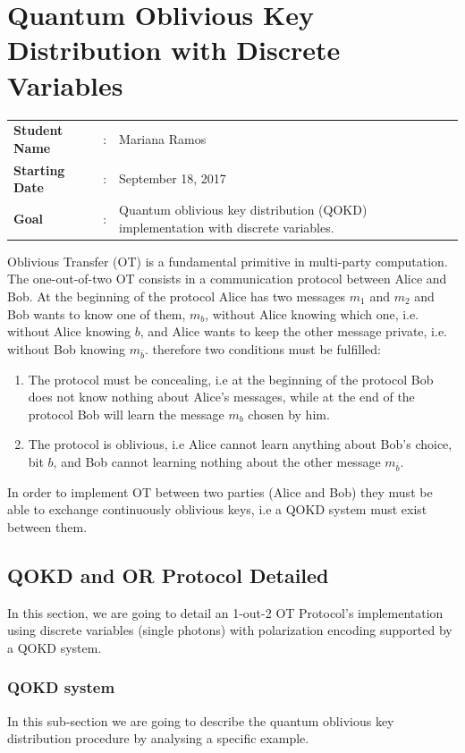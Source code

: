 \clearpage
\section{Quantum Oblivious Key Distribution with Discrete Variables}

\begin{tcolorbox}	
\begin{tabular}{p{2.75cm} p{0.2cm} p{10.5cm}} 	
\textbf{Student Name}  &:& Mariana Ramos\\
\textbf{Starting Date} &:& September 18, 2017\\
\textbf{Goal}          &:& Quantum oblivious key distribution (QOKD) implementation with discrete variables.
\end{tabular}
\end{tcolorbox}

Oblivious Transfer (OT) is a fundamental primitive in multi-party computation. The one-out-of-two OT consists in a communication protocol between Alice and Bob. At the beginning of the protocol Alice has two messages $m_1$ and $m_2$ and Bob wants to know one of them, $m_b$, without Alice knowing which one, i.e. without Alice knowing $b$, and Alice wants to keep the other message private, i.e. without Bob knowing $m_{\bar{b}}$. therefore two conditions must be fulfilled:
\begin{enumerate}
	\item{The protocol must be concealing, i.e at the beginning of the protocol Bob does not know nothing about Alice's messages, while at the end of the protocol Bob will learn the message $m_{b}$ chosen by him.}
	\item{The protocol is oblivious, i.e Alice cannot learn anything about Bob's choice, bit $b$, and Bob cannot learning nothing about the other message $m_{\bar{b}}$.}
\end {enumerate}

In order to implement OT between two parties (Alice and Bob) they must be able to exchange continuously oblivious keys, i.e a QOKD system must exist between them.

\subsection{QOKD and OR Protocol Detailed}
In this section, we are going to detail an 1-out-2 OT Protocol's implementation using discrete variables (single photons) with polarization encoding supported by a QOKD system.

\subsubsection{QOKD system}
In this sub-section we are going to describe the quantum oblivious key distribution procedure by analysing a specific example.


